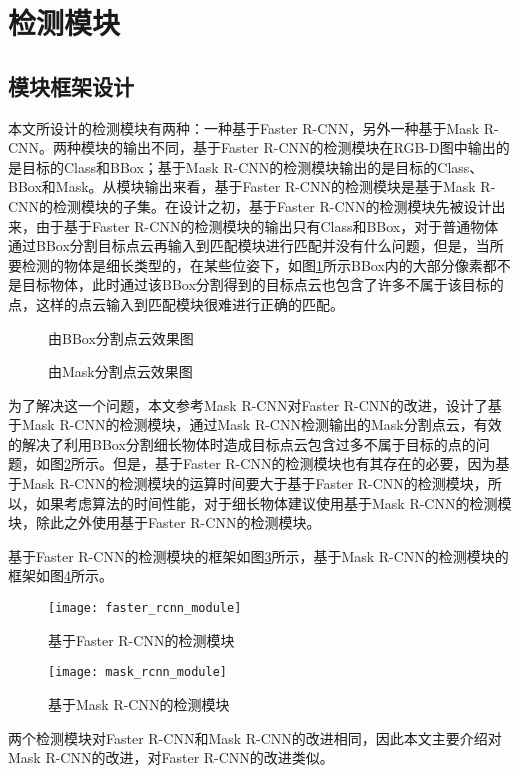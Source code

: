 \section{检测模块}
\label{sec:detector}
\subsection{模块框架设计}
本文所设计的检测模块有两种：一种基于Faster R-CNN，另外一种基于Mask R-CNN。两种模块的输出不同，基于Faster R-CNN的检测模块在RGB-D图中输出的是目标的Class和BBox；基于Mask R-CNN的检测模块输出的是目标的Class、BBox和Mask。从模块输出来看，基于Faster R-CNN的检测模块是基于Mask R-CNN的检测模块的子集。在设计之初，基于Faster R-CNN的检测模块先被设计出来，由于基于Faster R-CNN的检测模块的输出只有Class和BBox，对于普通物体通过BBox分割目标点云再输入到匹配模块进行匹配并没有什么问题，但是，当所要检测的物体是细长类型的，在某些位姿下，如图\ref{fig:bbox-segment}所示BBox内的大部分像素都不是目标物体，此时通过该BBox分割得到的目标点云也包含了许多不属于该目标的点，这样的点云输入到匹配模块很难进行正确的匹配。
\begin{figure}[ht]
  \centering
  \hskip1cm
  \caption{由BBox分割点云效果图}
  \label{fig:bbox-segment}
\end{figure}

\begin{figure}[ht]
  \centering
  \hskip1cm
  \caption{由Mask分割点云效果图}
  \label{fig:mask-segment}
\end{figure}
为了解决这一个问题，本文参考Mask R-CNN对Faster R-CNN的改进，设计了基于Mask R-CNN的检测模块，通过Mask R-CNN检测输出的Mask分割点云，有效的解决了利用BBox分割细长物体时造成目标点云包含过多不属于目标的点的问题，如图\ref{fig:mask-segment}所示。但是，基于Faster R-CNN的检测模块也有其存在的必要，因为基于Mask R-CNN的检测模块的运算时间要大于基于Faster R-CNN的检测模块，所以，如果考虑算法的时间性能，对于细长物体建议使用基于Mask R-CNN的检测模块，除此之外使用基于Faster R-CNN的检测模块。

基于Faster R-CNN的检测模块的框架如图\ref{fig:3d_faster_rcnn}所示，基于Mask R-CNN的检测模块的框架如图\ref{fig:3d_mask_rcnn}所示。
\begin{figure}[ht]
  \centering
  \texttt{[image: faster\_rcnn\_module]}
  \caption{基于Faster R-CNN的检测模块}
  \label{fig:3d_faster_rcnn}
\end{figure}
\begin{figure}[ht]
  \centering
  \texttt{[image: mask\_rcnn\_module]}
  \caption{基于Mask R-CNN的检测模块}
  \label{fig:3d_mask_rcnn}
\end{figure}
两个检测模块对Faster R-CNN和Mask R-CNN的改进相同，因此本文主要介绍对Mask R-CNN的改进，对Faster R-CNN的改进类似。

